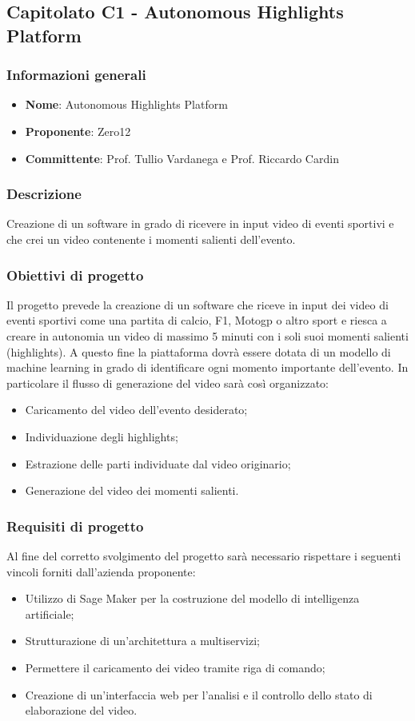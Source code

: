\subsection{Capitolato C1 - Autonomous Highlights Platform}
\subsubsection{Informazioni generali}
\begin{itemize}
	\item \textbf{Nome}: Autonomous Highlights Platform
	\item \textbf{Proponente}: Zero12
	\item \textbf{Committente}: Prof. Tullio Vardanega e Prof. Riccardo Cardin
\end{itemize}
\subsubsection{Descrizione}
Creazione di un software in grado di ricevere in input video di eventi sportivi e che crei un video contenente i momenti salienti dell'evento.
\subsubsection{Obiettivi di progetto}
Il progetto prevede la creazione di un software che riceve in input dei video di eventi sportivi come una partita di calcio, F1, Motogp o altro sport e riesca a creare in autonomia un video di massimo 5 minuti con i soli suoi momenti salienti (highlights). A questo fine la piattaforma dovrà essere dotata di un modello di machine learning in grado di identificare ogni momento importante dell’evento.
In particolare il flusso di generazione del video sarà così organizzato:
\begin{itemize}
	\item Caricamento del video dell'evento desiderato;
	\item Individuazione degli highlights;
	\item Estrazione delle parti individuate dal video originario;
	\item Generazione del video dei momenti salienti.
\end{itemize}
\subsubsection{Requisiti di progetto}
Al fine del corretto svolgimento del progetto sarà necessario rispettare i seguenti vincoli forniti dall'azienda proponente:
\begin{itemize}
	\item Utilizzo di Sage Maker per la costruzione del modello di intelligenza artificiale;
	\item Strutturazione di un'architettura a multiservizi;
	\item Permettere il caricamento dei video tramite riga di comando;
	\item Creazione di un'interfaccia web per l'analisi e il controllo dello stato di elaborazione del video.
\end{itemize}
